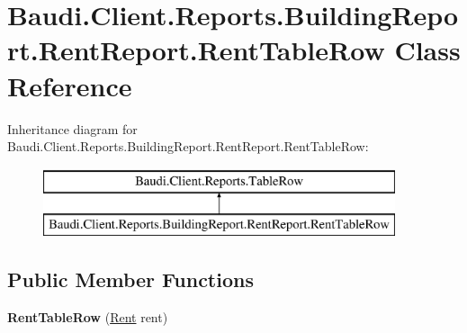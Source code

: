 \hypertarget{class_baudi_1_1_client_1_1_reports_1_1_building_report_1_1_rent_report_1_1_rent_table_row}{}\section{Baudi.\+Client.\+Reports.\+Building\+Report.\+Rent\+Report.\+Rent\+Table\+Row Class Reference}
\label{class_baudi_1_1_client_1_1_reports_1_1_building_report_1_1_rent_report_1_1_rent_table_row}
Inheritance diagram for Baudi.\+Client.\+Reports.\+Building\+Report.\+Rent\+Report.\+Rent\+Table\+Row\+:\begin{figure}[H]
\begin{center}
\leavevmode
\includegraphics[height=2.000000cm]{class_baudi_1_1_client_1_1_reports_1_1_building_report_1_1_rent_report_1_1_rent_table_row}
\end{center}
\end{figure}
\subsection*{Public Member Functions}
\begin{DoxyCompactItemize}
\item 
\hypertarget{class_baudi_1_1_client_1_1_reports_1_1_building_report_1_1_rent_report_1_1_rent_table_row_ab272155d9ec6bf4d1bc01476dff97ab9}{}{\bfseries Rent\+Table\+Row} (\hyperlink{class_baudi_1_1_d_a_l_1_1_models_1_1_rent}{Rent} rent)\label{class_baudi_1_1_client_1_1_reports_1_1_building_report_1_1_rent_report_1_1_rent_table_row_ab272155d9ec6bf4d1bc01476dff97ab9}

\end{DoxyCompactItemize}
